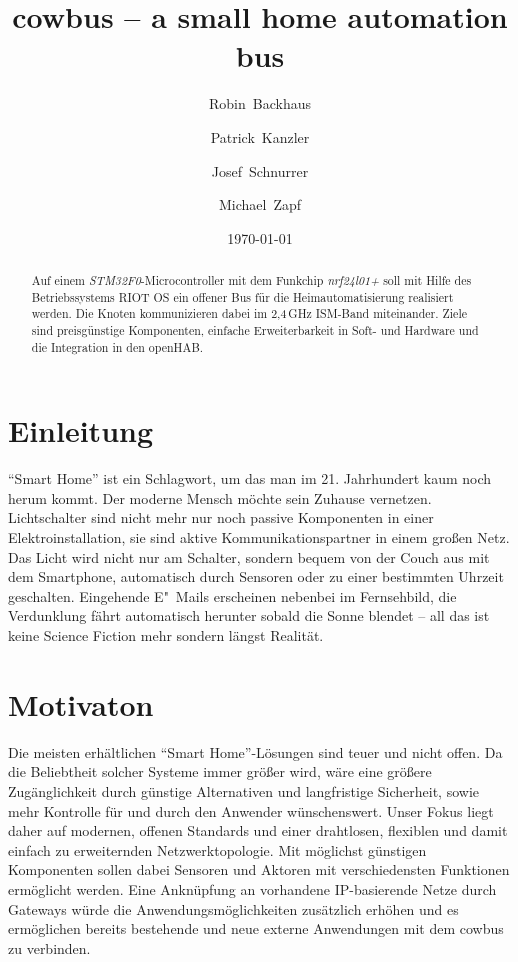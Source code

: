 \documentclass{IEEEtran}
\begin{document}
\title{cowbus -- a small home automation bus}
\author{Robin~Backhaus \and Patrick~Kanzler \and Josef~Schnurrer \and Michael~Zapf}
\date{\today}



\maketitle

\begin{abstract}
Auf einem \emph{STM32F0}-Microcontroller mit dem Funkchip \emph{nrf24l01+} soll
mit Hilfe des Betriebssystems RIOT OS ein offener Bus für die
Heimautomatisierung realisiert werden.
Die Knoten kommunizieren dabei im 2,4\,GHz ISM-Band miteinander.
Ziele sind preisgünstige Komponenten, einfache Erweiterbarkeit in Soft- und
Hardware und die Integration in den \ac{openHAB}.
\end{abstract}

\section{Einleitung}
    \enquote{Smart Home} ist ein Schlagwort, um das man im 21. Jahrhundert
    kaum noch herum kommt. Der moderne Mensch möchte sein Zuhause vernetzen.
    Lichtschalter sind nicht mehr nur noch passive Komponenten in einer
    Elektroinstallation, sie sind aktive Kommunikationspartner in einem großen Netz.
    Das Licht wird nicht nur am Schalter, sondern bequem von der Couch aus mit dem
    Smartphone, automatisch durch Sensoren oder zu einer bestimmten Uhrzeit geschalten. 
    Eingehende E"~Mails erscheinen nebenbei im Fernsehbild, die Verdunklung fährt 
    automatisch herunter sobald die Sonne blendet --
    all das ist keine Science Fiction mehr sondern längst Realität.

\section{Motivaton}
    Die meisten erhältlichen \enquote{Smart Home}-Lösungen sind teuer und nicht offen.
    Da die Beliebtheit solcher Systeme immer größer wird, wäre eine größere 
    Zugänglichkeit durch günstige Alternativen und langfristige Sicherheit, 
    sowie mehr Kontrolle für und durch den Anwender wünschenswert.
    Unser Fokus liegt daher auf modernen, offenen Standards und einer drahtlosen, 
    flexiblen und damit einfach zu erweiternden Netzwerktopologie.
    Mit möglichst günstigen Komponenten sollen dabei Sensoren und Aktoren 
    mit verschiedensten Funktionen ermöglicht werden.
    Eine Anknüpfung an vorhandene IP-basierende Netze durch Gateways würde die 
    Anwendungsmöglichkeiten zusätzlich erhöhen 
    und es ermöglichen bereits bestehende und neue externe Anwendungen mit dem 
    cowbus zu verbinden.
\end{document}
